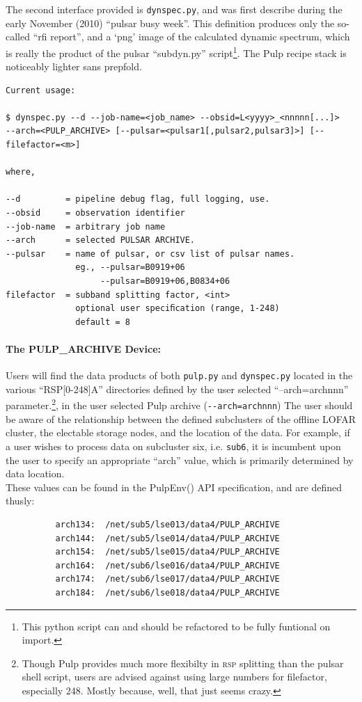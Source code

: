 \documentclass[a4paper,10pt,bibtotoc]{scrartcl}
\begin{document}
The second interface provided is \verb|dynspec.py|, and was first
describe during the early November (2010) ``pulsar busy week''.  This
definition produces only the so-called ``rfi report'', and a `png'
image of the calculated dynamic spectrum, which is really
the product of the pulsar ``subdyn.py'' script\footnote{This python
  script can and should be refactored to be fully funtional on import.}.
The Pulp recipe stack is noticeably lighter sans prepfold.
\begin{verbatim}
Current usage:

$ dynspec.py --d --job-name=<job_name> --obsid=L<yyyy>_<nnnnn[...]>
--arch=<PULP_ARCHIVE> [--pulsar=<pulsar1[,pulsar2,pulsar3]>] [--filefactor=<m>]

where,

--d         = pipeline debug flag, full logging, use.
--obsid     = observation identifier          
--job-name  = arbitrary job name             
--arch      = selected PULSAR ARCHIVE.
--pulsar    = name of pulsar, or csv list of pulsar names.
              eg., --pulsar=B0919+06
                   --pulsar=B0919+06,B0834+06
filefactor  = subband splitting factor, <int>
              optional user speciﬁcation (range, 1-248)
              default = 8
\end{verbatim}
\paragraph{The PULP\_ARCHIVE Device:}Users will find the data products of both \verb|pulp.py| and  \verb|dynspec.py| located in the
various ``RSP[0-248]A'' directories defined by the user selected ``--arch=archnnn'' parameter.\footnote{Though Pulp provides
  much more flexibilty in \textsc{rsp} splitting than the pulsar shell
  script, users are advised against using large numbers for
  filefactor, especially 248.  Mostly because, well, that just seems
  crazy.}, in the user selected Pulp archive (\verb|--arch=archnnn|) The user should be aware of the relationship between the defined subclusters of the offline LOFAR cluster, the electable storage nodes, and the location of the data.  For example, if a user wishes to process data on subcluster six, i.e. \verb|sub6|, it is incumbent upon the user to specify an appropriate ``arch'' value,  which is primarily determined by data location.  \\
These values can be found in the PulpEnv() API specification, and are defined thusly:
\begin{verbatim}
          arch134:  /net/sub5/lse013/data4/PULP_ARCHIVE
          arch144:  /net/sub5/lse014/data4/PULP_ARCHIVE
          arch154:  /net/sub5/lse015/data4/PULP_ARCHIVE
          arch164:  /net/sub6/lse016/data4/PULP_ARCHIVE
          arch174:  /net/sub6/lse017/data4/PULP_ARCHIVE
          arch184:  /net/sub6/lse018/data4/PULP_ARCHIVE
\end{verbatim}
\end{document}
